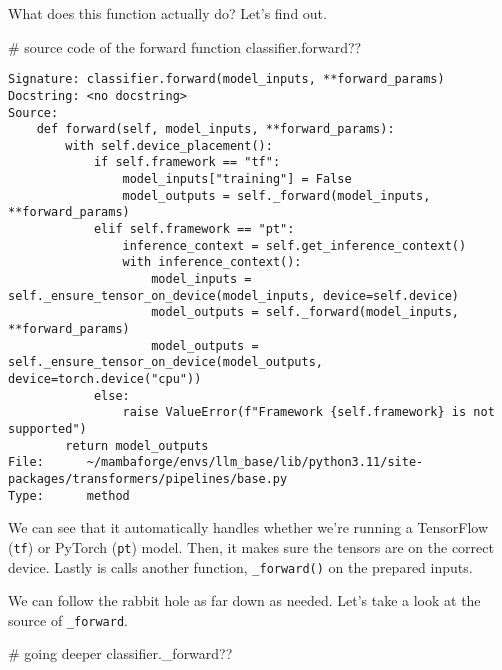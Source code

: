 \documentclass[
  letterpaper,
  DIV=11,
  numbers=noendperiod]{scrartcl}
\newenvironment{Shaded}{\begin{snugshade}}{\end{snugshade}}
\newcommand{\CommentTok}[1]{\textcolor[rgb]{0.37,0.37,0.37}{#1}}
\newcommand{\NormalTok}[1]{\textcolor[rgb]{0.00,0.23,0.31}{#1}}
\begin{document}
What does this function actually do? Let's find out.

\begin{Shaded}
\begin{Highlighting}[]
\CommentTok{\# source code of the forward function}
\NormalTok{classifier.forward??}
\end{Highlighting}
\end{Shaded}

\begin{verbatim}
Signature: classifier.forward(model_inputs, **forward_params)
Docstring: <no docstring>
Source:   
    def forward(self, model_inputs, **forward_params):
        with self.device_placement():
            if self.framework == "tf":
                model_inputs["training"] = False
                model_outputs = self._forward(model_inputs, **forward_params)
            elif self.framework == "pt":
                inference_context = self.get_inference_context()
                with inference_context():
                    model_inputs = self._ensure_tensor_on_device(model_inputs, device=self.device)
                    model_outputs = self._forward(model_inputs, **forward_params)
                    model_outputs = self._ensure_tensor_on_device(model_outputs, device=torch.device("cpu"))
            else:
                raise ValueError(f"Framework {self.framework} is not supported")
        return model_outputs
File:      ~/mambaforge/envs/llm_base/lib/python3.11/site-packages/transformers/pipelines/base.py
Type:      method
\end{verbatim}

We can see that it automatically handles whether we're running a
TensorFlow (\texttt{tf}) or PyTorch (\texttt{pt}) model. Then, it makes
sure the tensors are on the correct device. Lastly is calls another
function, \texttt{\_forward()} on the prepared inputs.

We can follow the rabbit hole as far down as needed. Let's take a look
at the source of \texttt{\_forward}.

\begin{Shaded}
\begin{Highlighting}[]
\CommentTok{\# going deeper}
\NormalTok{classifier.\_forward??}
\end{Highlighting}
\end{Shaded}
\end{document}

